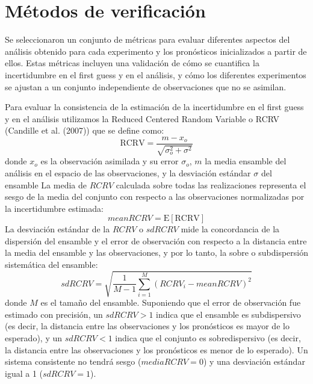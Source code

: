 \documentclass[12pt,oneside]{reedthesis}
\begin{document}
\hypertarget{muxe9todos-de-verificaciuxf3n}{%
\section{Métodos de verificación}\label{muxe9todos-de-verificaciuxf3n}}

Se seleccionaron un conjunto de métricas para evaluar diferentes aspectos del análisis obtenido para cada experimento y los pronósticos inicializados a partir de ellos. Estas métricas incluyen una validación de cómo se cuantifica la incertidumbre en el first guess y en el análisis, y cómo los diferentes experimentos se ajustan a un conjunto independiente de observaciones que no se asimilan.

Para evaluar la consistencia de la estimación de la incertidumbre en el first guess y en el análisis utilizamos la Reduced Centered Random Variable o RCRV (Candille et al. (2007)) que se define como:
\begin{equation}
  \mathrm{RCRV} = \frac{m - x_o}{\sqrt{\sigma_o^2 + \sigma^2}}
  \label{eq:eq6}
\end{equation}
donde \(x_o\) es la observación asimilada y su error \(\sigma_o\), \(m\) la media ensamble del análisis en el espacio de las observaciones, y la desviación estándar \(\sigma\) del ensamble
La media de \(RCRV\) calculada sobre todas las realizaciones representa el sesgo de la media del conjunto con respecto a las observaciones normalizadas por la incertidumbre estimada:
\begin{equation}
  \mathrm{\mathit{mean RCRV} = E[RCRV]}
  \label{eq:eq7}
\end{equation}
La desviación estándar de la \(RCRV\) o \(sd RCRV\) mide la concordancia de la dispersión del ensamble y el error de observación con respecto a la distancia entre la media del ensamble y las observaciones, y por lo tanto, la sobre o subdispersión sistemática del ensamble:
\begin{equation}
  \mathit{sd RCRV} = \sqrt{\frac{1}{M -1}\sum_{i=1}^{M}(RCRV_i - \mathit{mean RCRV})^2}
  \label{eq:eq8}
\end{equation}
donde \(M\) es el tamaño del ensamble. Suponiendo que el error de observación fue estimado con precisión, un \(sd RCRV > 1\) indica que el ensamble es subdispersivo (es decir, la distancia entre las observaciones y los pronósticos es mayor de lo esperado), y un \(sd RCRV < 1\) indica que el conjunto es sobredispersivo (es decir, la distancia entre las observaciones y los pronósticos es menor de lo esperado). Un sistema consistente no tendrá sesgo (\(media RCRV = 0\)) y una desviación estándar igual a 1 (\(sd RCRV = 1\)).
\end{document}
